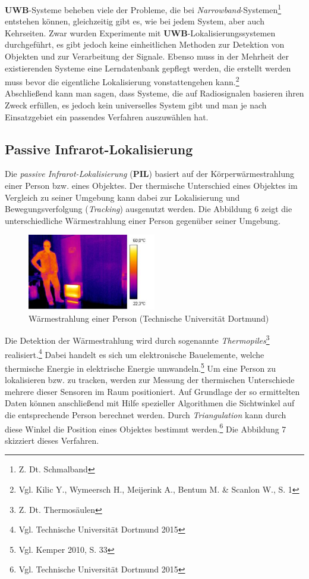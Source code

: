\textbf{UWB}-Systeme beheben viele der Probleme, die bei \textit{Narrowband}-Systemen\footnote{Z. Dt. Schmalband} entstehen können, gleichzeitig gibt es, wie bei jedem System, aber auch Kehrseiten. Zwar wurden Experimente mit \textbf{UWB}-Lokalisierungssystemen durchgeführt, es gibt jedoch keine einheitlichen Methoden zur Detektion von Objekten und zur Verarbeitung der Signale. Ebenso muss in der Mehrheit der existierenden Systeme eine Lerndatenbank gepflegt werden, die erstellt werden muss bevor die eigentliche Lokalisierung vonstattengehen kann.\footnote{Vgl. Kilic Y., Wymeersch H., Meijerink A., Bentum M. \& Scanlon W., S. 1}\\
Abschließend kann man sagen, dass Systeme, die auf Radiosignalen basieren ihren Zweck erfüllen, es jedoch kein universelles System gibt und man je nach Einsatzgebiet ein passendes Verfahren auszuwählen hat.


\subsection{Passive Infrarot-Lokalisierung}
Die \textit{passive Infrarot-Lokalisierung} (\textbf{PIL}) basiert auf der Körperwärmestrahlung einer Person bzw. eines Objektes. Der thermische Unterschied eines Objektes im Vergleich zu seiner Umgebung kann dabei zur Lokalisierung und Bewegungsverfolgung (\textit{Tracking}) ausgenutzt werden. Die Abbildung 6 zeigt die unterschiedliche Wärmestrahlung einer Person gegenüber seiner Umgebung.

\begin{figure}[H]
	\centering
	\includegraphics[width=0.5\textwidth]{pictures/pil1}
	\caption{Wärmestrahlung einer Person (Technische Universität Dortmund)}
\end{figure}

Die Detektion der Wärmestrahlung wird durch sogenannte \textit{Thermopiles}\footnote{Z. Dt. Thermosäulen}  realisiert.\footnote{Vgl. Technische Universität Dortmund 2015} Dabei handelt es sich um elektronische Bauelemente, welche thermische Energie in elektrische Energie umwandeln.\footnote{Vgl. Kemper 2010, S. 33} Um eine Person zu lokalisieren bzw. zu tracken, werden zur Messung der thermischen Unterschiede mehrere dieser Sensoren im Raum positioniert. Auf Grundlage der so ermittelten Daten können anschließend mit Hilfe spezieller Algorithmen die Sichtwinkel auf die entsprechende Person berechnet werden. Durch \textit{Triangulation} kann durch diese Winkel die Position eines Objektes bestimmt werden.\footnote{Vgl. Technische Universität Dortmund 2015} Die Abbildung 7 skizziert dieses Verfahren.

